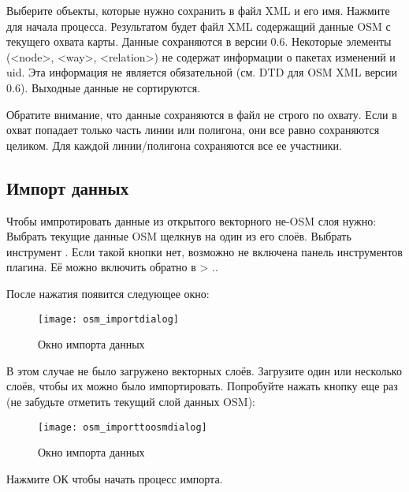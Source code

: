 Выберите объекты, которые нужно сохранить в файл XML и его имя. Нажмите
 для начала процесса. Результатом будет файл XML содержащий
данные OSM с текущего охвата карты. Данные сохраняются в версии 0.6.
Некоторые элементы (<node>, <way>, <relation>) не содержат информации о
пакетах изменений и uid. Эта информация не является обязательной (см.
DTD для OSM XML версии 0.6). Выходные данные не сортируются.

Обратите внимание, что данные сохраняются в файл не строго по охвату.
Если в охват попадает только часть линии или полигона, они все равно
сохраняются целиком. Для каждой линии/полигона сохраняются все ее
участники.

\subsection{Импорт данных}

Чтобы импротировать данные из открытого векторного не-OSM слоя нужно:
Выбрать текущие данные OSM щелкнув на один из его слоёв. Выбрать
инструмент . Если
такой кнопки нет, возможно не включена панель инструментов плагина. Её
можно включить обратно в  \arrow {}
> ..

После нажатия появится следующее окно:

\begin{figure}[ht]
   \centering
   \texttt{[image: osm\_importdialog]}
   \caption{Окно импорта данных \wincaption}\label{fig:osmimportmessage}
\end{figure}

В этом случае не было загружено векторных слоёв. Загрузите один или
несколько слоёв, чтобы их можно было импортировать. Попробуйте нажать
кнопку еще раз (не забудьте отметить текущий слой данных OSM):

\begin{figure}[ht]
   \centering
   \texttt{[image: osm\_importtoosmdialog]}
   \caption{Окно импорта данных \wincaption}\label{fig:osmimporttoosm}
\end{figure}

Нажмите ОК чтобы начать процесс импорта.

\FloatBarrier
